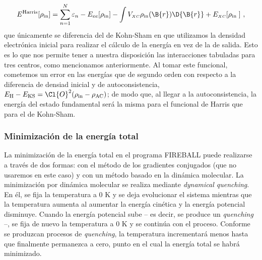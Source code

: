 \begin{equation}
    E^\text{Harris} [\rho_\text{in}] = \sum_{n=1}^N \varepsilon_n - E_{ee} [\rho_\text{in}] - \int V_{\scriptscriptstyle XC} \rho _\text{in} (\B{r}) \D{\B{r}} + E_{\scriptscriptstyle XC} [\rho_\text{in }] \label{HArris} \ , 
\end{equation}
que únicamente se diferencia del de Kohn-Sham en que utilizamos la densidad electrónica inicial para realizar el cálculo de la energía en vez de la de salida. Esto es lo que nos permite tener a nuestra disposición las interacciones tabuladas para tres centros, como mencionamos anteriormente. Al tomar este funcional, cometemos un error en las energías que de segundo orden con respecto a la diferencia de densiad inicial y de autoconsistencia, $E_\text{H} - E_\text{KS} = \Cl{O}^2(\rho_\text{in} - \rho_\text{AC})$; de modo que, al llegar a la autoconsistencia, la energía del estado fundamental será la misma para el funcional de Harris que para el de Kohn-Sham.  
\subsubsection{Minimización de la energía total}
La minimización de la energía total en el programa FIREBALL puede realizarse a través de dos formas: con el método de los gradientes conjugados (que no usaremos en este caso) y con un método basado en la dinámica molecular. La minimización por dinámica molecular se realiza mediante \emph{dynamical quenching}. En él, se fija la temperatura a 0 K y se deja evolucionar el sistema mientras que la temperatura aumenta al aumentar la energía cinética y la energía potencial disminuye. Cuando la energía potencial sube -- es decir, se produce un \emph{quenching} --, se fija de nuevo la temperatura a 0 K y se continúa con el proceso. Conforme se produzcan procesos de \emph{quenching}, la temperatura incrementará menos hasta que finalmente permanezca a cero, punto en el cual la energía total se habrá minimizado.
 
